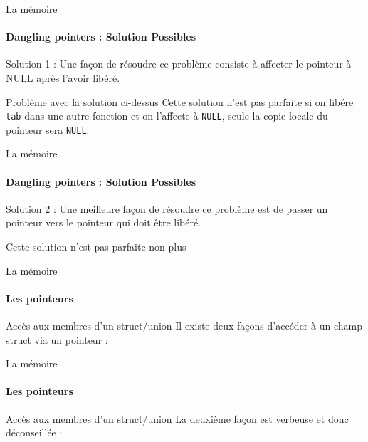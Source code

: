 	\begin{frame}{La mémoire}
		\framesubtitle{Dangling pointers : Solution Possibles}
		\begin{block}{Solution 1 :}
			Une façon de résoudre ce problème consiste à affecter le pointeur à NULL après l'avoir libéré.
			\danglingPtrTwoSolutionTemp
		\end{block}
		\begin{alertblock}{Problème avec la solution ci-dessus}
			Cette solution n'est pas parfaite si on libére \texttt{tab} dans une autre fonction et on l'affecte à \texttt{NULL}, seule la copie locale du pointeur sera \texttt{NULL}.
		\end{alertblock}
	\end{frame}

	\begin{frame}{La mémoire}
		\framesubtitle{Dangling pointers : Solution Possibles}
		\begin{block}{Solution 2 :}
			Une meilleure façon de résoudre ce problème est de passer un pointeur vers le pointeur qui doit être libéré.
			\danglingPtrTwoSolution
		\end{block}
		\begin{alertblock}{Cette solution n'est pas parfaite non plus}
		\end{alertblock}
	\end{frame}
	
	\begin{frame}{La mémoire}
		\framesubtitle{Les pointeurs}
		\begin{block}{Accès aux membres d'un struct/union}
			Il existe deux façons d'accéder à un champ struct via un pointeur :\\ 
			\ptrStructSyntaxOne
		\end{block}
	\end{frame}

	\begin{frame}{La mémoire}
		\framesubtitle{Les pointeurs}
		\begin{block}{Accès aux membres d'un struct/union}
			La deuxième façon est verbeuse et donc déconseillée :\\
			\ptrStructSyntaxTwo
		\end{block}
	\end{frame}
	
